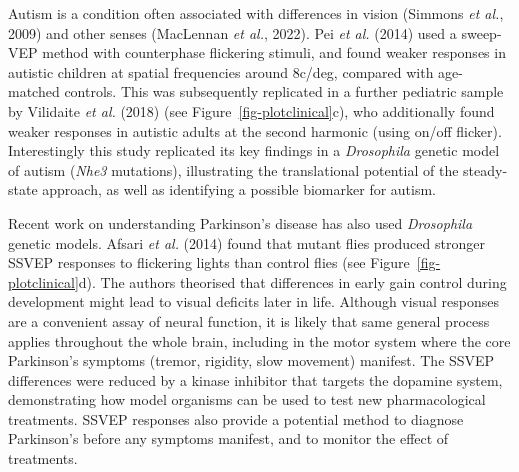 \documentclass[
  letterpaper,
  DIV=11,
  numbers=noendperiod]{scrartcl}
\begin{document}
Autism is a condition often associated with differences in vision
(Simmons \emph{et al.}, 2009) and other senses (MacLennan \emph{et al.},
2022). Pei \emph{et al.} (2014) used a sweep-VEP method with
counterphase flickering stimuli, and found weaker responses in autistic
children at spatial frequencies around 8c/deg, compared with age-matched
controls. This was subsequently replicated in a further pediatric sample
by Vilidaite \emph{et al.} (2018) (see Figure~\ref{fig-plotclinical}c),
who additionally found weaker responses in autistic adults at the second
harmonic (using on/off flicker). Interestingly this study replicated its
key findings in a \emph{Drosophila} genetic model of autism (\emph{Nhe3}
mutations), illustrating the translational potential of the steady-state
approach, as well as identifying a possible biomarker for autism.

Recent work on understanding Parkinson's disease has also used
\emph{Drosophila} genetic models. Afsari \emph{et al.} (2014) found that
mutant flies produced stronger SSVEP responses to flickering lights than
control flies (see Figure~\ref{fig-plotclinical}d). The authors
theorised that differences in early gain control during development
might lead to visual deficits later in life. Although visual responses
are a convenient assay of neural function, it is likely that same
general process applies throughout the whole brain, including in the
motor system where the core Parkinson's symptoms (tremor, rigidity, slow
movement) manifest. The SSVEP differences were reduced by a kinase
inhibitor that targets the dopamine system, demonstrating how model
organisms can be used to test new pharmacological treatments. SSVEP
responses also provide a potential method to diagnose Parkinson's before
any symptoms manifest, and to monitor the effect of treatments.
\end{document}
